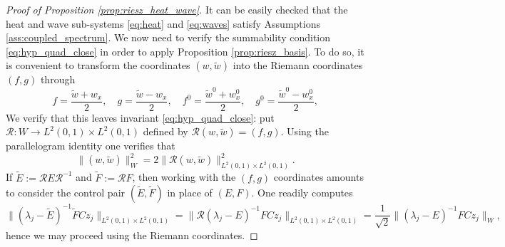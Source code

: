 \documentclass[10pt]{article}
\begin{document}
\begin{proof}[Proof of Proposition \ref{prop:riesz_heat_wave}]
It can be easily checked that the heat and wave sub-systems \eqref{eq:heat} and \eqref{eq:waves} satisfy Assumptions \ref{ass:coupled_spectrum}. We now need to verify the summability condition \eqref{eq:hyp_quad_close} in order to apply Proposition \ref{prop:riesz_basis}. To do so, it is convenient to transform the coordinates $(w,\tilde{w})$ into the Riemann coordinates $(f,g)$ through 
\begin{equation}\label{eq:riemann}
f = \frac{\tilde{w} + w_x}{2},\quad g = \frac{\tilde{w}-w_x}{2},\quad f^0 = \frac{\tilde{w}^0 + w_x^0}{2},\quad g^0 = \frac{\tilde{w}^0-w_x^0}{2},
\end{equation}
We verify that this leaves invariant \eqref{eq:hyp_quad_close}: put $\mathcal{R} : W \to L^2(0,1) \times L^2(0,1)$ defined by $\mathcal{R}(w,\tilde{w}) = (f,g)$. Using the parallelogram identity one verifies that 
\[
\| (w,\tilde{w}) \|_W^2 = 2 \| \mathcal{R}(w,\tilde{w})\|_{L^2(0,1) \times L^2(0,1)}^2.
\]
If $\tilde{E} := \mathcal{R} E \mathcal{R}^{-1}$ and $\tilde{F} := \mathcal{R} F$, then working with the $(f,g)$ coordinates amounts to consider the control pair $(\tilde{E}, \tilde{F})$ in place of $(E,F)$. One readily computes 
\[
\|(\lambda_j - \tilde{E})^{-1} \tilde{F} Cz_j \|_{L^2(0,1) \times L^2(0,1)} = \|\mathcal{R}(\lambda_j - E)^{-1} F Cz_j \|_{L^2(0,1) \times L^2(0,1)} = \frac{1}{\sqrt{2}} \|(\lambda_j - E)^{-1} F Cz_j \|_W,
\]	 
hence we may proceed using the Riemann coordinates. 


\end{proof}
\end{document}
